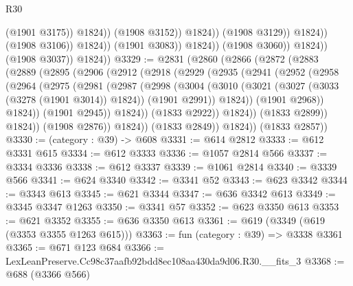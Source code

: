 \begin{lexlean}{R30}
\begin{coremodule}
                                              (@1901 @3175))
                                            @1824))
                                        (@1908 @3152))
                                      @1824))
                                  (@1908 @3129))
                                @1824))
                            (@1908 @3106))
                          @1824))
                      (@1901 @3083))
                    @1824))
                (@1908 @3060))
              @1824))
          (@1908 @3037))
        @1824))
@3329 := @2831
    (@2860
      (@2866
        (@2872
          (@2883
            (@2889
              (@2895
                (@2906
                  (@2912
                    (@2918
                      (@2929
                        (@2935
                          (@2941
                            (@2952
                              (@2958
                                (@2964
                                  (@2975
                                    (@2981
                                      (@2987
                                        (@2998
                                          (@3004
                                            (@3010
                                              (@3021
                                                (@3027 (@3033 (@3278 (@1901 @3014)) @1824))
                                                (@1901 @2991))
                                              @1824))
                                          (@1901 @2968))
                                        @1824))
                                    (@1901 @2945))
                                  @1824))
                              (@1833 @2922))
                            @1824))
                        (@1833 @2899))
                      @1824))
                  (@1908 @2876))
                @1824))
            (@1833 @2849))
          @1824))
      (@1833 @2857))
@3330 := (category : @39) -> @608
@3331 := @614 @2812
@3333 := @612 @3331 @615
@3334 := @612 @3333
@3336 := @1057 @2814 @566
@3337 := @3334 @3336
@3338 := @612 @3337
@3339 := @1061 @2814
@3340 := @3339 @566
@3341 := @624 @3340
@3342 := @3341 @52
@3343 := @623 @3342
@3344 := @3343 @613
@3345 := @621 @3344
@3347 := @636 @3342 @613
@3349 := @3345 @3347 @1263
@3350 := @3341 @57
@3352 := @623 @3350 @613
@3353 := @621 @3352
@3355 := @636 @3350 @613
@3361 := @619 (@3349 (@619 (@3353 @3355 @1263 @615)))
@3363 := fun (category : @39) => @3338 @3361
@3365 := @671 @123 @684
@3366 := LexLeanPreserve.Cc98c37aafb92bdd8ec108aa430da9d06.R30.__fits_3
@3368 := @688 (@3366 @566)

\end{coremodule}
\end{lexlean}
